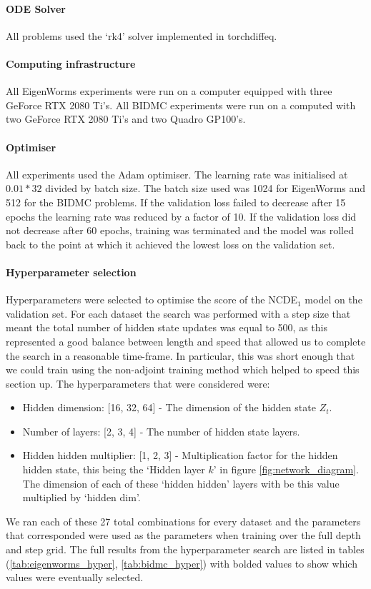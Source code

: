 \paragraph{ODE Solver} All problems used the `rk4' solver implemented in torchdiffeq. 

\paragraph{Computing infrastructure} All EigenWorms experiments were run on a computer equipped with three GeForce RTX 2080 Ti's. All BIDMC experiments were run on a computed with two GeForce RTX 2080 Ti's and two Quadro GP100's.

\paragraph{Optimiser} All experiments used the Adam optimiser. The learning rate was initialised at $0.01 * 32$ divided by batch size. The batch size used was 1024 for EigenWorms and 512 for the BIDMC problems. If the validation loss failed to decrease after 15 epochs the learning rate was reduced by a factor of 10. If the validation loss did not decrease after 60 epochs, training was terminated and the model was rolled back to the point at which it achieved the lowest loss on the validation set. 

\paragraph{Hyperparameter selection} Hyperparameters were selected to optimise the score of the NCDE$_1$ model on the validation set. For each dataset the search was performed with a step size that meant the total number of hidden state updates was equal to 500, as this represented a good balance between length and speed that allowed us to complete the search in a reasonable time-frame. In particular, this was short enough that we could train using the non-adjoint training method which helped to speed this section up. The hyperparameters that were considered were:
\begin{itemize}
    \item Hidden dimension: [16, 32, 64] - The dimension of the hidden state $Z_t$.
    \item Number of layers: [2, 3, 4] - The number of hidden state layers.
    \item Hidden hidden multiplier: [1, 2, 3] - Multiplication factor for the hidden hidden state, this being the `Hidden layer $k$' in figure \ref{fig:network_diagram}. The dimension of each of these `hidden hidden' layers with be this value multiplied by `hidden dim'.
\end{itemize}
We ran each of these 27 total combinations for every dataset and the parameters that corresponded were used as the parameters when training over the full depth and step grid. The full results from the hyperparameter search are listed in tables (\ref{tab:eigenworms_hyper}, \ref{tab:bidmc_hyper}) with bolded values to show which values were eventually selected. 






